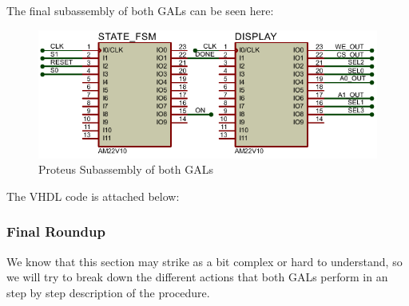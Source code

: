 \vspace{0.5cm}

The final subassembly of both GALs can be seen here:

\begin{figure}[H]
    \centering
    \includegraphics[scale = 1]{Graphics/STATE_FSM + DISPLAY/PROTEUS_BOTH.PDF}
    \caption{Proteus Subassembly of both GALs}
    \label{fig:PROTEUS_STATE_FSM_DISPLAY}
\end{figure}

\clearpage

The VHDL code is attached below:

\vspace{-0.1cm}


\subsubsection{Final Roundup}
\label{sec:STATE_FSM_DISPLAY_ROUNDUP}

We know that this section may strike as a bit complex or hard to understand, so we will try to break down the different actions that both GALs perform in an step by step description of the procedure.

